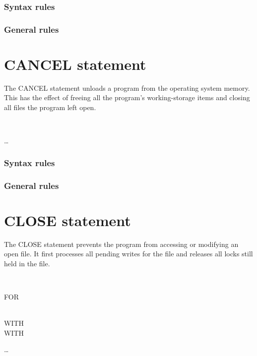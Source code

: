 \subsubsection{Syntax rules}

\subsubsection{General rules}

\section{CANCEL statement}

The CANCEL statement unloads a program from the operating system memory. This has the effect of freeing all the program's working-storage items and closing all files the program left open.

\begin{syntax}
  \begin{1=}
    \identifier \\
    \literal
  \end{1=} \ldots
\end{syntax}

\subsubsection{Syntax rules}

\subsubsection{General rules}

\section{CLOSE statement}

The CLOSE statement prevents the program from accessing or modifying an open file. It first processes all pending writes for the file and releases all locks still held in the file.

\begin{syntax}
  \begin{1=}
    \filename
    \begin{0-1}
      \begin{1=}
         \\
      \end{1=}
      \begin{0-1}
        FOR 
      \end{0-1} \\

      WITH   \\
      WITH 
    \end{0-1}
  \end{1=} \ldots
\end{syntax}

